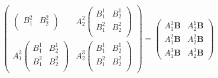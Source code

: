 \documentclass[a4paper,11pt]{article}
\begin{document}
\begin{equation}
\begin{pmatrix}
\begin{pmatrix}
      B^2_1 & B^2_2 \\
    \end{pmatrix}
    &
    A^2_2
    \begin{pmatrix}
      B^1_1 & B^1_2 \\
      B^2_1 & B^2_2 \\
    \end{pmatrix}
    \\
    A^3_1
    \begin{pmatrix}
      B^1_1 & B^1_2 \\
      B^2_1 & B^2_2 \\
    \end{pmatrix}
    &
    A^3_2
    \begin{pmatrix}
      B^1_1 & B^1_2 \\
      B^2_1 & B^2_2 \\
    \end{pmatrix}
  \end{pmatrix}
  =
  \begin{pmatrix}
    A^1_1\mathbf{B} & A^1_2\mathbf{B} \\
    A^2_1\mathbf{B} & A^2_2\mathbf{B} \\
    A^3_1\mathbf{B} & A^3_2\mathbf{B}
  \end{pmatrix}
\end{equation}
\end{document}
